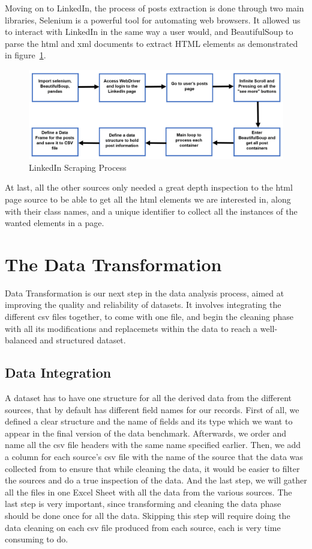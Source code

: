 Moving on to LinkedIn, the process of posts extraction is done through two main libraries, Selenium is a powerful tool for automating web browsers. It allowed us to interact with LinkedIn in the same way a user would, and BeautifulSoup to parse the \ac{html} and \ac{xml} documents to extract HTML elements as demonstrated in figure~\ref{fig:linkedin}.

\begin{figure}[H]
\centering
\includegraphics[width=14cm]{LinkedIn}
\caption{LinkedIn Scraping Process}
\label{fig:linkedin}
\end{figure}

At last, all the other sources only needed a great depth inspection to the \ac{html} page source to be able to get all the \ac{html} elements we are interested in, along with their class names, and a unique identifier to collect all the instances of the wanted elements in a page.

\section{The Data Transformation}
Data Transformation is our next step in the data analysis process, aimed at improving the quality and reliability of datasets. It involves integrating the different \ac{csv} files together, to come with one file, and begin the cleaning phase with all its modifications and replacemets within the data to reach a well-balanced and structured dataset.

\subsection{Data Integration}
A dataset has to have one structure for all the derived data from the different sources, that by default has different field names for our records. First of all, we defined a clear structure and the name of fields and its type which we want to appear in the final version of the data benchmark. Afterwards, we order and name all the \ac{csv} file headers with the same name specified earlier. Then, we add a column for each source's \ac{csv} file with the name of the source that the data was collected from to ensure that while cleaning the data, it would be easier to filter the sources and do a true inspection of the data. And the last step, we will gather all the files in one Excel Sheet with all the data from the various sources. The last step is very important, since transforming and cleaning the data phase should be done once for all the data. Skipping this step will require doing the data cleaning on each \ac{csv} file produced from each source, each is very time consuming to do.

